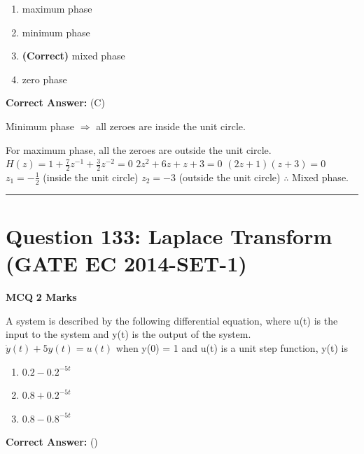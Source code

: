 \documentclass[11pt,a4paper]{article}
\begin{document}
\begin{enumerate}[label=(\Alph*)]
    \item maximum phase
    \item minimum phase
    \item \textbf{(Correct)} mixed phase
    \item zero phase
\end{enumerate}

\noindent \textbf{Correct Answer:} (C)

\begin{tcolorbox}[solbox, title=Detailed Solution -- Question 132]
Minimum phase  $\Rightarrow$  all zeroes are inside the unit
circle.

For maximum phase, all the zeroes are outside
the unit circle.
$H(z)=1+\frac{7}{2} z^{-1}+\frac{3}{2} z^{-2}=0$
$2 z^{2}+6 z+z+3=0$
$(2 z+1)(z+3)=0$
$z_{1}=-\frac{1}{2}$  (inside the unit circle)
$z_{2}=-3$  (outside the unit circle) 
$\therefore$ Mixed phase.
\end{tcolorbox}

\vspace{1.5em}
\hrule
\vspace{1.5em}

\section*{Question 133: Laplace Transform (GATE EC 2014-SET-1)}
\noindent \textbf{\color{primary}MCQ} \hfill \textbf{\color{secondary}2 Marks}


\noindent A system is described by the following differential equation, where u(t) is the
input to the system and y(t) is the output of the system.
 $\dot{y}(t)+5y(t)=u(t)$ 
when y(0) = 1 and u(t)  is a unit step function, y(t)  is


\begin{enumerate}[label=(\Alph*)]
    \item $0.2-0.2^{-5t}$
    \item $0.8+0.2^{-5t}$
    \item $0.8-0.8^{-5t}$
\end{enumerate}

\noindent \textbf{Correct Answer:} ()
\end{document}
